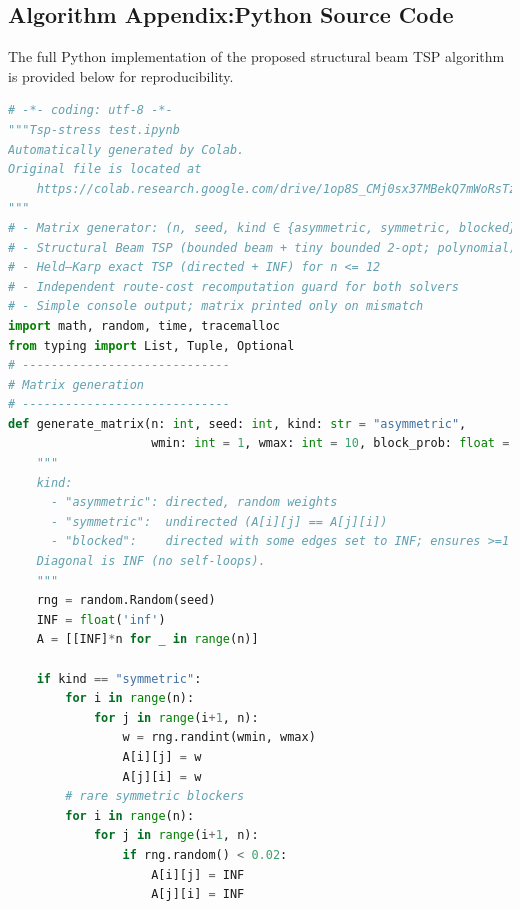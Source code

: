 \documentclass[sn-mathphys]{article}
\theoremstyle{thmstyleone}%
\theoremstyle{thmstyletwo}%
\theoremstyle{thmstylethree}%
\begin{document}
\begin{appendices}
\section{Algorithm Appendix:Python Source Code}\label{secA1}

The full Python implementation of the proposed structural beam TSP algorithm is provided below for reproducibility.
\lstset{
    language=Python,
    basicstyle=\ttfamily\tiny,     %
    breaklines=true,               %
    breakatwhitespace=false,       %
    columns=fullflexible,          %
    xleftmargin=0pt,               %
    xrightmargin=0pt,              %
    aboveskip=2pt, belowskip=2pt,  %
    frame=single                   %
}

\begin{lstlisting}[language=Python]
# -*- coding: utf-8 -*-
"""Tsp-stress test.ipynb
Automatically generated by Colab.
Original file is located at
    https://colab.research.google.com/drive/1op8S_CMj0sx37MBekQ7mWoRsTzog9B6p
"""
# - Matrix generator: (n, seed, kind ∈ {asymmetric, symmetric, blocked})
# - Structural Beam TSP (bounded beam + tiny bounded 2-opt; polynomial)
# - Held–Karp exact TSP (directed + INF) for n <= 12
# - Independent route-cost recomputation guard for both solvers
# - Simple console output; matrix printed only on mismatch
import math, random, time, tracemalloc
from typing import List, Tuple, Optional
# -----------------------------
# Matrix generation
# -----------------------------
def generate_matrix(n: int, seed: int, kind: str = "asymmetric",
                    wmin: int = 1, wmax: int = 10, block_prob: float = 0.05) -> List[List[float]]:
    """
    kind:
      - "asymmetric": directed, random weights
      - "symmetric":  undirected (A[i][j] == A[j][i])
      - "blocked":    directed with some edges set to INF; ensures >=1 outgoing per node
    Diagonal is INF (no self-loops).
    """
    rng = random.Random(seed)
    INF = float('inf')
    A = [[INF]*n for _ in range(n)]

    if kind == "symmetric":
        for i in range(n):
            for j in range(i+1, n):
                w = rng.randint(wmin, wmax)
                A[i][j] = w
                A[j][i] = w
        # rare symmetric blockers
        for i in range(n):
            for j in range(i+1, n):
                if rng.random() < 0.02:
                    A[i][j] = INF
                    A[j][i] = INF


\end{lstlisting}
\end{appendices}
\end{document}
